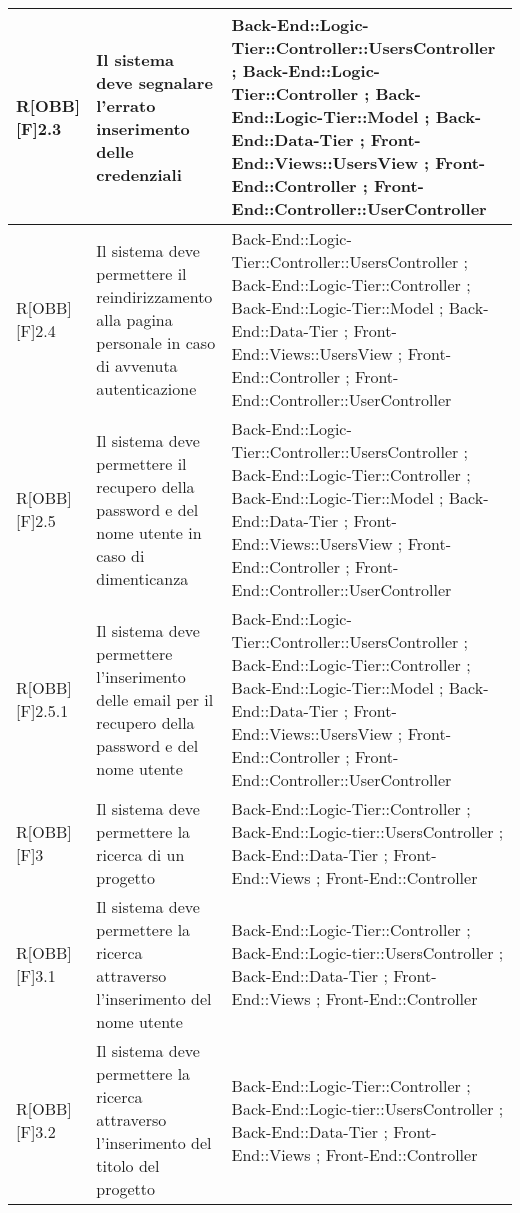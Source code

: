 	\begin{table}[h]
			\begin{tabular}{|p{}|p{}|p{}|}
			\midrule
	
			
			R[OBB][F]2.3 & Il sistema deve segnalare l'errato inserimento delle credenziali & Back-End::Logic-Tier::Controller::UsersController ; Back-End::Logic-Tier::Controller ; Back-End::Logic-Tier::Model ; Back-End::Data-Tier ; Front-End::Views::UsersView ; Front-End::Controller ; Front-End::Controller::UserController \\ \midrule
			R[OBB][F]2.4 & Il sistema deve permettere il reindirizzamento alla pagina personale in caso di avvenuta autenticazione & Back-End::Logic-Tier::Controller::UsersController ; Back-End::Logic-Tier::Controller ; Back-End::Logic-Tier::Model ; Back-End::Data-Tier ; Front-End::Views::UsersView ; Front-End::Controller ; Front-End::Controller::UserController \\ \midrule
			R[OBB][F]2.5 & Il sistema deve permettere il recupero della password e del nome utente in caso di dimenticanza & Back-End::Logic-Tier::Controller::UsersController ; Back-End::Logic-Tier::Controller ; Back-End::Logic-Tier::Model ; Back-End::Data-Tier ; Front-End::Views::UsersView ; Front-End::Controller ; Front-End::Controller::UserController \\ \midrule
			R[OBB][F]2.5.1 & Il sistema deve permettere l'inserimento delle email per il recupero della password e del nome utente & Back-End::Logic-Tier::Controller::UsersController ; Back-End::Logic-Tier::Controller ; Back-End::Logic-Tier::Model ; Back-End::Data-Tier ; Front-End::Views::UsersView ; Front-End::Controller ; Front-End::Controller::UserController \\ \midrule
			R[OBB][F]3 & Il sistema deve permettere la ricerca di un progetto  & Back-End::Logic-Tier::Controller ; Back-End::Logic-tier::UsersController ; Back-End::Data-Tier ; Front-End::Views ; Front-End::Controller \\ \midrule
			R[OBB][F]3.1 & Il sistema deve permettere la ricerca attraverso l'inserimento del nome utente & Back-End::Logic-Tier::Controller ; Back-End::Logic-tier::UsersController ; Back-End::Data-Tier ; Front-End::Views ; Front-End::Controller \\ \midrule
			R[OBB][F]3.2 & Il sistema deve permettere la ricerca attraverso l'inserimento del titolo del progetto & Back-End::Logic-Tier::Controller ; Back-End::Logic-tier::UsersController ; Back-End::Data-Tier ; Front-End::Views ; Front-End::Controller \\ \midrule

\end{tabular}
\end{table}
